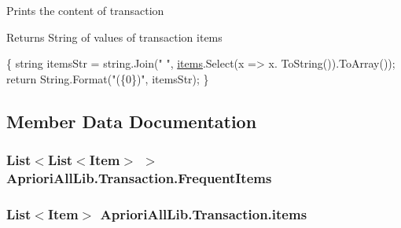Prints the content of transaction 

\begin{DoxyReturn}{Returns}
String of values of transaction items
\end{DoxyReturn}

\begin{DoxyCode}
                                          \{
            \textcolor{keywordtype}{string} itemsStr = \textcolor{keywordtype}{string}.Join(\textcolor{stringliteral}{" "}, \hyperlink{class_apriori_all_lib_1_1_transaction_ae815fd730576c0592d47895a2c8b420d}{items}.Select(x => x.
      ToString()).ToArray());
            \textcolor{keywordflow}{return} String.Format(\textcolor{stringliteral}{"(\{0\})"}, itemsStr);
        \}
\end{DoxyCode}


\subsection{Member Data Documentation}
\hypertarget{class_apriori_all_lib_1_1_transaction_a2ee6b2f74a842edb646ec8f99e5f7b8f}{
\subsubsection[{Frequent\-Items}]{\setlength{\rightskip}{0pt plus 5cm}List$<$List$<${\bf Item}$>$ $>$ Apriori\-All\-Lib.\-Transaction.\-Frequent\-Items}}\label{class_apriori_all_lib_1_1_transaction_a2ee6b2f74a842edb646ec8f99e5f7b8f}
\hypertarget{class_apriori_all_lib_1_1_transaction_ae815fd730576c0592d47895a2c8b420d}{
\subsubsection[{items}]{\setlength{\rightskip}{0pt plus 5cm}List$<${\bf Item}$>$ Apriori\-All\-Lib.\-Transaction.\-items\hspace{0.3cm}{\ttfamily [private]}}}\label{class_apriori_all_lib_1_1_transaction_ae815fd730576c0592d47895a2c8b420d}



